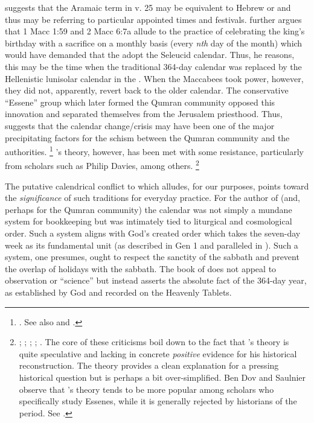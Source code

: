 \noindent
\vanderkam suggests that the Aramaic term  in v. 25 may be equivalent to Hebrew  or  and thus may be referring to particular appointed times and festivals.%
    \autocite[59--60]{vanderkam_jsj1981}
\vanderkam further argues that 1 Macc 1:59 and 2 Macc 6:7a allude to the practice of celebrating the king's birthday with a sacrifice on a monthly basis (every \emph{nth} day of the month) which would have demanded that the \jerusalemtemple adopt the Seleucid calendar. Thus, he reasons, this may be the time when the traditional 364-day calendar was replaced by the Hellenistic lunisolar calendar in the \jerusalemtemple. When the Maccabees took power, however, they did not, apparently, revert back to the older calendar. The conservative ``Essene'' group which later formed the Qumran community opposed this innovation and separated themselves from the Jerusalem priesthood. Thus, \vanderkam suggests that the calendar change/crisis may have been one of the major precipitating factors for the schism between the Qumran community and the \jerusalemtemple authorities.%
    \footnote{%
        \Cite[52]{vanderkam_jsj1981}. See also 
        \cite{collins_chazon-etal1999} and 
        \cite{blenkinsopp_sanders1981}.}
\vanderkam's theory, however, has been met with some resistance, particularly from scholars such as Philip Davies, among others.%
    \footnote{%
        \cite{davies_cbq1983};
        \cite{wacholder-wacholder_huca1995};
        \cite{stern_lim-etal2000};
        \cite{stern_zpe2000};
        \cite[29 n. 136]{stern2001}.
        The core of these criticisms boil down to the fact that \vanderkam's theory is quite speculative and lacking in concrete \emph{positive} evidence for his historical reconstruction. The theory provides a clean explanation for a pressing historical question but is perhaps a bit over-simplified. Ben Dov and Saulnier observe that \vanderkam's theory tends to be more popular among scholars who specifically study Essenes, while it is generally rejected by historians of the \secondtemple period. See \cite[142]{bendov-saulnier_cbr2008}.}

The putative calendrical conflict to which \jub alludes, for our purposes, points toward the \emph{significance} of such traditions for everyday practice. For the author of \jub (and, perhaps for the Qumran community) the calendar was not simply a mundane system for bookkeeping but was intimately tied to liturgical  and cosmological order.%
    \autocite{fraade_dine-israel2010}
Such a system aligns with God's created order which takes the seven-day week as its fundamental unit (as described in Gen 1 and paralleled in ). Such a system, one presumes, ought to respect the sanctity of the sabbath and prevent the overlap of holidays with the sabbath. The book of \jub does not appeal to observation or ``science'' but instead asserts the absolute fact of the 364-day year, as established by God and recorded on the Heavenly Tablets. 

